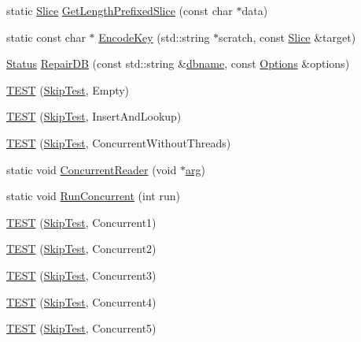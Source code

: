 \begin{DoxyCompactItemize}
\item 
static \hyperlink{classleveldb_1_1_slice}{Slice} \hyperlink{namespaceleveldb_afe94b0b5eec2b0272aed6f45042a70c8}{Get\-Length\-Prefixed\-Slice} (const char $\ast$data)
\item 
static const char $\ast$ \hyperlink{namespaceleveldb_a1e6f16ce568bfceff4ba4d9623d7d795}{Encode\-Key} (std\-::string $\ast$scratch, const \hyperlink{classleveldb_1_1_slice}{Slice} \&target)
\item 
\hyperlink{classleveldb_1_1_status}{Status} \hyperlink{namespaceleveldb_afb65664fdacb30ab73da9414db5a4208}{Repair\-D\-B} (const std\-::string \&\hyperlink{c__test_8c_a75d845559336df6843f3b599960f89d2}{dbname}, const \hyperlink{structleveldb_1_1_options}{Options} \&options)
\item 
\hyperlink{namespaceleveldb_a94b31a20798f6d72a6cd11c328fcaba7}{T\-E\-S\-T} (\hyperlink{classleveldb_1_1_skip_test}{Skip\-Test}, Empty)
\item 
\hyperlink{namespaceleveldb_a21e74b2de9a6f3db48c8d3ff277a1e0d}{T\-E\-S\-T} (\hyperlink{classleveldb_1_1_skip_test}{Skip\-Test}, Insert\-And\-Lookup)
\item 
\hyperlink{namespaceleveldb_a7a43c7e5a10488ca82072e3cc871fcb2}{T\-E\-S\-T} (\hyperlink{classleveldb_1_1_skip_test}{Skip\-Test}, Concurrent\-Without\-Threads)
\item 
static void \hyperlink{namespaceleveldb_a3b35abcf0dac45639f63dbe6b56a60f8}{Concurrent\-Reader} (void $\ast$\hyperlink{env__posix_8cc_a9ce2ec4812a92cb6ab39f6e81e9173a9}{arg})
\item 
static void \hyperlink{namespaceleveldb_a46451103024ca345fc73c3a6126b5b48}{Run\-Concurrent} (int run)
\item 
\hyperlink{namespaceleveldb_a1997f90d2777db110a06646c9a3c7ba2}{T\-E\-S\-T} (\hyperlink{classleveldb_1_1_skip_test}{Skip\-Test}, Concurrent1)
\item 
\hyperlink{namespaceleveldb_a0ac3fd3bf30e8efdbdead6e963ffbe3d}{T\-E\-S\-T} (\hyperlink{classleveldb_1_1_skip_test}{Skip\-Test}, Concurrent2)
\item 
\hyperlink{namespaceleveldb_a95f25d807cc1b1a16a34f9a3a24fb7bc}{T\-E\-S\-T} (\hyperlink{classleveldb_1_1_skip_test}{Skip\-Test}, Concurrent3)
\item 
\hyperlink{namespaceleveldb_a491925bfd0a0eb00edbbbbc0f1d3c0c9}{T\-E\-S\-T} (\hyperlink{classleveldb_1_1_skip_test}{Skip\-Test}, Concurrent4)
\item 
\hyperlink{namespaceleveldb_ae94270b577d135677ad028bef3170a16}{T\-E\-S\-T} (\hyperlink{classleveldb_1_1_skip_test}{Skip\-Test}, Concurrent5)

\end{DoxyCompactItemize}
